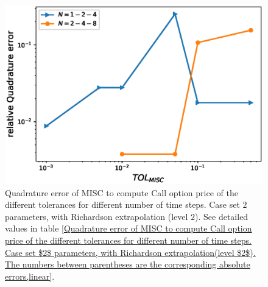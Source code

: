 \begin{figure}[h!]
	\centering
	\includegraphics[width=0.4\linewidth]{./figures/rBergomi_MISC_quadratre_error/vs_TOL/set2/relative_quad_error_wrt_MISC_TOL_set2_rich_level2_linear}
	
	
	\caption{Quadrature error of MISC to compute Call option price of the different tolerances for different number of time steps. Case  set $2$ parameters, with Richardson extrapolation (level $2$).  See detailed values  in table \ref{Quadrature error of MISC to compute Call option price of the different tolerances for different number of time steps. Case set $2$ parameters, with Richardson extrapolation(level $2$). The numbers between parentheses are the corresponding absolute errors,linear}.}
	\label{fig:Quadrature_error_set2_rich_linear}
\end{figure}


